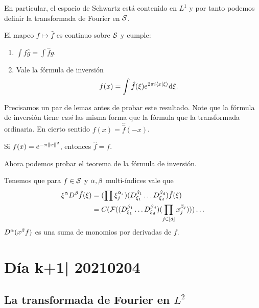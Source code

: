 \documentclass[12pt]{memoir}
\begin{document}
En particular, el espacio de Schwartz está contenido en $L^1$ y por tanto podemos definir la transformada de Fourier en $\mathcal{S}$.

\begin{Th}
  El mapeo $f\mapsto\hat f$ es continuo sobre $\mathcal{S}$ y cumple:
  \begin{enumerate}
    \item $\int f\hat g=\int\hat fg$.
    \item Vale la fórmula de inversión
     $$f(x)=\int\hat f(\xi)e^{2\pi i\braket{x}{\xi}}\dd\xi.$$
  \end{enumerate}
\end{Th}

Precisamos un par de lemas antes de probar este resultado. Note que la fórmula de inversión tiene \emph{casi} las misma forma que la fórmula que la transformada ordinaria. En cierto sentido $f(x)=\hat{\hat f}(-x)$.

\begin{Lem}
Si $f(x)=e^{-\pi\left\|x\right\|^2}$, entonces $\hat{f}=f$. 
\end{Lem}

\begin{ptcbp}
\end{ptcbp}

Ahora podemos probar el teorema de la fórmula de inversión.

\begin{ptcbp}
  Tenemos que para $f\in\mathcal{S}$ y $\alpha,\beta$ multi-índices vale que 
  \begin{align*}
    \xi^\alpha D^{\beta}\hat{f}(\xi)&=(\prod\xi_j^{\alpha_j})(D_{\xi_1}^{\beta_1}\dots D_{\xi_d}^{\beta_d})\hat{f}(\xi)\\
    &=C(\mathcal{F}((D_{\xi_1}^{\beta_1}\dots D_{\xi_d}^{\beta_d})(\prod_{j\in[d]}x_j^{\beta_j})))\dots
  \end{align*}
  $D^\alpha(x^\beta f)$ es una suma de monomios por derivadas de $f$.
\end{ptcbp}

\section{Día k+1| 20210204}

\subsection{La transformada de Fourier en $L^2$}
\par
\end{document}
